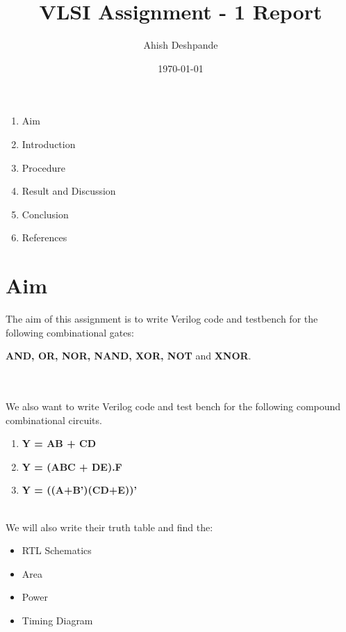 \documentclass[a4paper,11pt]{report}
\begin{document}
\title{VLSI Assignment - 1 Report}
\author{Ahish Deshpande}
\date{\today}
\maketitle


\tableofcontents
\begin{enumerate}

\item Aim
\item Introduction
\item Procedure
\item Result and Discussion
\item Conclusion
\item References

\end{enumerate}
\newpage

\renewcommand\thesection{\arabic{section}}
\section{Aim}
The aim of this assignment is to write Verilog code and testbench for the following combinational gates:
  \begin{center}\textbf{AND, OR, NOR, NAND, XOR, NOT} and \textbf{XNOR}. \end{center}\\\\
We also want to write Verilog code and test bench for the following compound combinational circuits.
\begin{enumerate}
\item \textbf{Y = AB + CD}
\item \textbf{Y = (ABC + DE).F}
\item \textbf{Y = ((A+B')(CD+E))'}
\end{enumerate} \\
We will also write their truth table and find the:
\begin{itemize}
\item RTL Schematics
\item Area
\item Power
\item Timing Diagram
\end{itemize}
\end{document}
